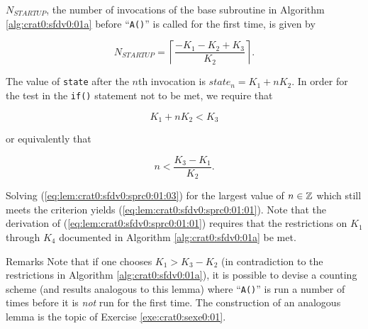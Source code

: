 \begin{vworklemmastatement}
\label{lem:crat0:sfdv0:sprc0:01}
$N_{STARTUP}$, the number of invocations of the base subroutine
in Algorithm \ref{alg:crat0:sfdv0:01a} before ``\texttt{A()}'' is called
for the first time, is given by

\begin{equation}
\label{eq:lem:crat0:sfdv0:sprc0:01:01}
N_{STARTUP} = 
\left\lceil
{
\frac{-K_1 - K_2 + K_3}{K_2}
}
\right\rceil .
\end{equation} 
\end{vworklemmastatement}
\begin{vworklemmaproof}
The value of \texttt{state} after the $n$th invocation
is $state_n = K_1 + n K_2$.  In order for the test in the 
\texttt{if()} statement not to be met, we require that

\begin{equation}
\label{eq:lem:crat0:sfdv0:sprc0:01:02}
K_1 + n K_2 < K_3
\end{equation} 

\noindent{}or equivalently that

\begin{equation}
\label{eq:lem:crat0:sfdv0:sprc0:01:03}
n < \frac{K_3 - K_1}{K_2} .
\end{equation} 

Solving (\ref{eq:lem:crat0:sfdv0:sprc0:01:03}) for the largest
value of $n \in {\mathbb{Z}}$ which still meets the criterion
yields (\ref{eq:lem:crat0:sfdv0:sprc0:01:01}).  Note that 
the derivation of (\ref{eq:lem:crat0:sfdv0:sprc0:01:01}) requires
that the restrictions on $K_1$ through $K_4$ documented in
Algorithm \ref{alg:crat0:sfdv0:01a} be met.
\end{vworklemmaproof}
\begin{vworklemmaparsection}{Remarks}
Note that if one chooses $K_1 > K_3 - K_2$ (in contradiction to the
restrictions in Algorithm \ref{alg:crat0:sfdv0:01a}), it is possible
to devise a counting scheme (and results analogous to this lemma) where
``\texttt{A()}'' is run a number of times before it is
\emph{not} run for the first time.  The construction of an analogous
lemma is the topic of Exercise \ref{exe:crat0:sexe0:01}.
\end{vworklemmaparsection}

